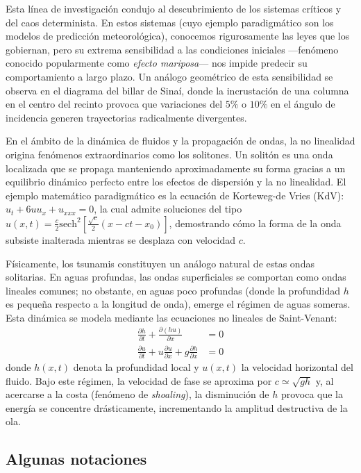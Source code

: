\documentclass[11pt,a4paper]{article}
\theoremstyle{definition}
\theoremstyle{plain}
\begin{document}
Esta línea de investigación condujo al descubrimiento de los sistemas críticos y del caos determinista. En estos sistemas (cuyo ejemplo paradigmático son los modelos de predicción meteorológica), conocemos rigurosamente las leyes que los gobiernan, pero su extrema sensibilidad a las condiciones iniciales —fenómeno conocido popularmente como \textit{efecto mariposa}— nos impide predecir su comportamiento a largo plazo. Un análogo geométrico de esta sensibilidad se observa en el diagrama del billar de Sinaí, donde la incrustación de una columna en el centro del recinto provoca que variaciones del $5\%$ o $10\%$ en el ángulo de incidencia generen trayectorias radicalmente divergentes.

En el ámbito de la dinámica de fluidos y la propagación de ondas, la no linealidad origina fenómenos extraordinarios como los solitones. Un solitón es una onda localizada que se propaga manteniendo aproximadamente su forma gracias a un equilibrio dinámico perfecto entre los efectos de dispersión y la no linealidad. El ejemplo matemático paradigmático es la ecuación de Korteweg-de Vries (KdV): $u_t + 6uu_x + u_{xxx} = 0$, la cual admite soluciones del tipo $u(x,t) = \frac{c}{2} \text{sech}^2\left[ \frac{\sqrt{c}}{2}(x - ct - x_0) \right]$, demostrando cómo la forma de la onda subsiste inalterada mientras se desplaza con velocidad $c$.

Físicamente, los tsunamis constituyen un análogo natural de estas ondas solitarias. En aguas profundas, las ondas superficiales se comportan como ondas lineales comunes; no obstante, en aguas poco profundas (donde la profundidad $h$ es pequeña respecto a la longitud de onda), emerge el régimen de aguas someras. Esta dinámica se modela mediante las ecuaciones no lineales de Saint-Venant:
\begin{align*}
    \frac{\partial h}{\partial t} + \frac{\partial (hu)}{\partial x} &= 0 \\
    \frac{\partial u}{\partial t} + u \frac{\partial u}{\partial x} + g \frac{\partial h}{\partial x} &= 0
\end{align*}
donde $h(x,t)$ denota la profundidad local y $u(x,t)$ la velocidad horizontal del fluido. Bajo este régimen, la velocidad de fase se aproxima por $c \simeq \sqrt{gh}$ y, al acercarse a la costa (fenómeno de \textit{shoaling}), la disminución de $h$ provoca que la energía se concentre drásticamente, incrementando la amplitud destructiva de la ola.

\subsection{Algunas notaciones}
\end{document}
